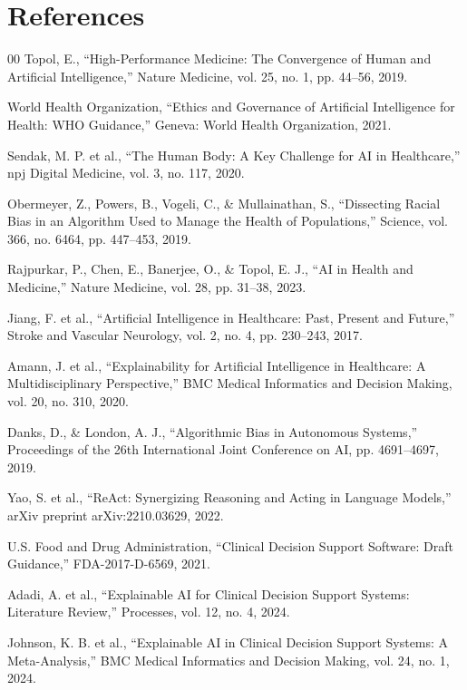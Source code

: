 \documentclass[conference]{IEEEtran}
\begin{document}
\section*{References}
\begin{thebibliography}{00}
 Topol, E., ``High-Performance Medicine: The Convergence of Human and Artificial Intelligence,'' Nature Medicine, vol. 25, no. 1, pp. 44--56, 2019.

 World Health Organization, ``Ethics and Governance of Artificial Intelligence for Health: WHO Guidance,'' Geneva: World Health Organization, 2021.

 Sendak, M. P. et al., ``The Human Body: A Key Challenge for AI in Healthcare,'' npj Digital Medicine, vol. 3, no. 117, 2020.

 Obermeyer, Z., Powers, B., Vogeli, C., \& Mullainathan, S., ``Dissecting Racial Bias in an Algorithm Used to Manage the Health of Populations,'' Science, vol. 366, no. 6464, pp. 447--453, 2019.

 Rajpurkar, P., Chen, E., Banerjee, O., \& Topol, E. J., ``AI in Health and Medicine,'' Nature Medicine, vol. 28, pp. 31--38, 2023.

 Jiang, F. et al., ``Artificial Intelligence in Healthcare: Past, Present and Future,'' Stroke and Vascular Neurology, vol. 2, no. 4, pp. 230--243, 2017.

 Amann, J. et al., ``Explainability for Artificial Intelligence in Healthcare: A Multidisciplinary Perspective,'' BMC Medical Informatics and Decision Making, vol. 20, no. 310, 2020.

 Danks, D., \& London, A. J., ``Algorithmic Bias in Autonomous Systems,'' Proceedings of the 26th International Joint Conference on AI, pp. 4691--4697, 2019.

 Yao, S. et al., ``ReAct: Synergizing Reasoning and Acting in Language Models,'' arXiv preprint arXiv:2210.03629, 2022.

 U.S. Food and Drug Administration, ``Clinical Decision Support Software: Draft Guidance,'' FDA-2017-D-6569, 2021.

 Adadi, A. et al., ``Explainable AI for Clinical Decision Support Systems: Literature Review,'' Processes, vol. 12, no. 4, 2024.

 Johnson, K. B. et al., ``Explainable AI in Clinical Decision Support Systems: A Meta-Analysis,'' BMC Medical Informatics and Decision Making, vol. 24, no. 1, 2024.


\end{thebibliography}
\end{document}
